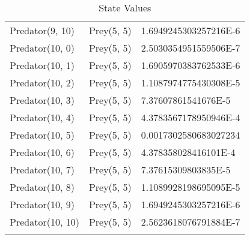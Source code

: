 \begin{longtable}{| p{} | p{} | p{} |}
Predator(9, 10) & Prey(5, 5) &1.6949245303257216E-6\\
Predator(10, 0) & Prey(5, 5) &2.5030354951559506E-7\\
Predator(10, 1) & Prey(5, 5) &1.6905970383762533E-6\\
Predator(10, 2) & Prey(5, 5) &1.1087974775430308E-5\\
Predator(10, 3) & Prey(5, 5) &7.37607861541676E-5\\
Predator(10, 4) & Prey(5, 5) &4.3783567178950946E-4\\
Predator(10, 5) & Prey(5, 5) &0.0017302580683027234\\
Predator(10, 6) & Prey(5, 5) &4.378358028416101E-4\\
Predator(10, 7) & Prey(5, 5) &7.37615309803835E-5\\
Predator(10, 8) & Prey(5, 5) &1.1089928198695095E-5\\
Predator(10, 9) & Prey(5, 5) &1.6949245303257216E-6\\
Predator(10, 10) & Prey(5, 5) &2.5623618076791884E-7\\
\caption{State Values} 
\label{tab:myfirstlongtable}
\end{longtable}

